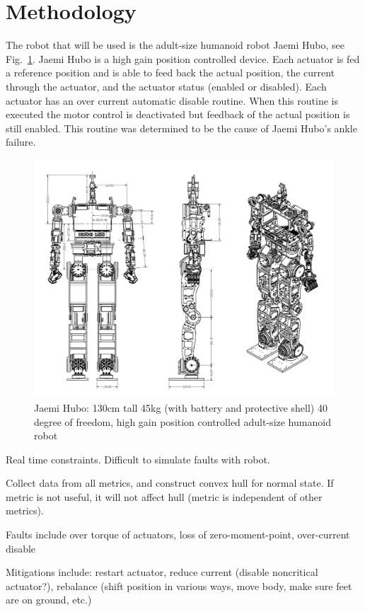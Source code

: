 \section{Methodology}

The robot that will be used is the adult-size humanoid robot Jaemi Hubo, see Fig.~\ref{fig:huboSch}.  Jaemi Hubo is a high gain position controlled device.  Each actuator is fed a reference position and is able to feed back the actual position, the current through the actuator, and the actuator status (enabled or disabled).  Each actuator has an over current automatic disable routine.  When this routine is executed the motor control is deactivated but feedback of the actual position is still enabled.  This routine was determined to be the cause of Jaemi Hubo's ankle failure.

\begin{figure}[thpb]
  \centering
\includegraphics[width=1.0\columnwidth]{./pix/huboSch.png}
  \caption{Jaemi Hubo: 130cm tall 45kg (with battery and protective shell) 40 degree of freedom, high gain position controlled adult-size humanoid robot }
  \label{fig:huboSch}
\end{figure}

Real time constraints. Difficult to simulate faults with robot.

Collect data from all metrics, and construct convex hull for normal state. If metric is not useful, it will not affect hull (metric is independent of other metrics).

Faults include over torque of actuators, loss of zero-moment-point, over-current disable

Mitigations include: restart actuator, reduce current (disable noncritical actuator?), rebalance (shift position in various ways, move body, make sure feet are on ground, etc.)